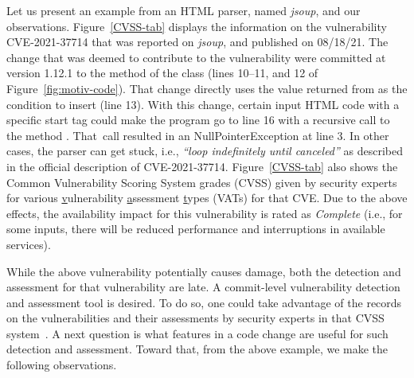 

Let us present an example from an HTML parser, named {\em jsoup}, and
our observations. Figure~\ref{CVSS-tab} displays the information on
the vulnerability CVE-2021-37714 that was reported on {\em jsoup}, and
published on 08/18/21. The change that was deemed to contribute to the
vulnerability were committed at version 1.12.1 to the method
 of the
 class (lines 10--11, and 12 of
Figure~\ref{fig:motiv-code}). That change directly uses the value
returned from  as the condition to
insert  (line 13). With this change, certain input HTML
code with a specific start tag could make the program go to line 16
with a recursive call to the method . That~call
resulted in an NullPointerException at line 3.
In other cases, the parser can get stuck, i.e., {\em ``loop
  indefinitely until canceled''} as described in the official
description of CVE-2021-37714. Figure~\ref{CVSS-tab} also shows the
Common Vulnerability Scoring System grades (CVSS) given by security
experts for various \underline{v}ulnerability \underline{a}ssessment
\underline{t}ypes (VATs) for that CVE. Due to the above effects, the
availability impact for this vulnerability is rated as {\em Complete}
(i.e., for some inputs, there will be reduced performance and
interruptions in available services).

While the above vulnerability potentially causes damage, both the
detection and assessment for that vulnerability are late. A
commit-level vulnerability detection and assessment tool is desired.
To do so, one could take advantage of the records on the
vulnerabilities and their assessments by security experts in that CVSS
system~\cite{first-website}. A next question is what features in a
code change are useful for such detection and assessment. Toward
 that, from the above example, we make the following
observations.

